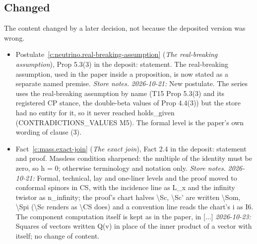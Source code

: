\documentclass[11pt]{article}
\theoremstyle{definition}
\theoremstyle{plain}
\begin{document}
\subsection*{Changed}
The content changed by a later decision, not because the deposited version was wrong.
\begin{itemize}\setlength{\itemsep}{2pt}
\item Postulate~\ref{c:neutrino.real-breaking-assumption} (\emph{The real-breaking assumption}), Prop 5.3(3) in the deposit: statement. The real-breaking assumption, used in the paper inside a proposition, is now stated as a separate named premise. \emph{Store notes.} \emph{2026-10-21:} New postulate. The series uses the real-breaking assumption by name (T15 Prop 5.3(3) and its registered CP stance, the double-beta values of Prop 4.4(3)) but the store had no entity for it, so it never reached holds\_given (CONTRADICTIONS\_VALUES M5). The formal level is the paper's own wording of clause (3).
\item Fact~\ref{c:mass.exact-join} (\emph{The exact join}), Fact 2.4 in the deposit: statement and proof. Massless condition sharpened: the multiple of the identity must be zero, so h = 0; otherwise terminology and notation only. \emph{Store notes.} \emph{2026-10-21:} Formal, technical, lay and one-liner levels and the proof moved to conformal spinors in CS, with the incidence line as L\_x and the infinity twistor as n\_infinity; the proof's chart halves \textbackslash{}Sc, \textbackslash{}Sc' are written \textbackslash{}Som, \textbackslash{}Spi (\textbackslash{}Sc renders as \textbackslash{}CS does) and a convention line reads the chart's i as I6. The component computation itself is kept as in the paper, in [...] \emph{2026-10-23:} Squares of vectors written Q(v) in place of the inner product of a vector with itself; no change of content.
\end{itemize}
\end{document}
